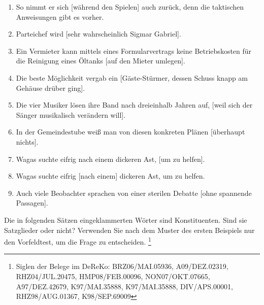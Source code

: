 \begin{enumerate}\Lf
  \item So nimmt er sich [während den Spielen] auch zurück, denn die taktischen Anweisungen gibt es vorher.
  \item Parteichef wird [sehr wahrscheinlich Sigmar Gabriel].
  \item Ein Vermieter kann mittels eines Formularvertrags keine Betriebskosten für die Reinigung eines Öltanks [auf den Mieter umlegen].
  \item Die beste Möglichkeit vergab ein [Gäste-Stürmer, dessen Schuss knapp am Gehäuse drüber ging].
  \item Die vier Musiker lösen ihre Band nach dreieinhalb Jahren auf, [weil sich der Sänger musikalisch verändern will].
  \item In der Gemeindestube weiß man von diesen konkreten Plänen [überhaupt nichts].
  \item Wagas suchte eifrig nach einem dickeren Ast, [um zu helfen].
  \item Wagas suchte eifrig [nach einem] dickeren Ast, um zu helfen.
  \item Auch viele Beobachter sprachen von einer sterilen Debatte [ohne spannende Passagen].
\end{enumerate}

\Uebung \label{u102} Die in folgenden Sätzen eingeklammerten Wörter sind Konstituenten.
Sind sie Satzglieder oder nicht?
Verwenden Sie nach dem Muster des ersten Beispiels nur den Vorfeldtest, um die Frage zu entscheiden.%
\footnote{Siglen der Belege im DeReKo: BRZ06\slash MAI.05936, A09\slash DEZ.02319, RHZ04\slash JUL.20475, HMP08\slash FEB.00096, NON07\slash OKT.07665, A97\slash DEZ.42679, K97\slash MAI.35888, K97\slash MAI.35888, DIV\slash APS.00001, RHZ98\slash AUG.01367, K98\slash SEP.69009}

